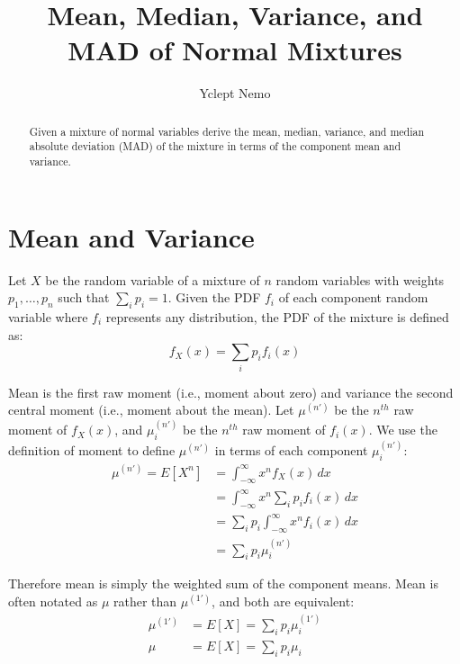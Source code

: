 \documentclass{article}
\title{Mean, Median, Variance, and MAD of Normal Mixtures}
\author{Yclept Nemo}
\begin{document}

\maketitle

\begin{abstract}\noindent
Given a mixture of normal variables derive the mean, median, variance, and median absolute deviation (MAD) of the mixture in terms of the component mean and variance.
\end{abstract}

\section{Mean and Variance}

Let $X$ be the random variable of a mixture of $n$ random variables with weights $p_1, \ldots, p_n$ such that $\sum_i p_i = 1$. Given the PDF $f_i$ of each component random variable where $f_i$ represents any distribution, the PDF of the mixture is defined as:
%
\begin{equation}\label{Mixture PDF}
f_X(x) = \sum_i p_i f_i(x)
\end{equation}

Mean is the first raw moment (i.e., moment about zero) and variance the second central moment (i.e., moment about the mean). Let $\mu^{(n')}$ be the $n^{th}$ raw moment of $f_X(x)$, and $\mu^{(n')}_i$ be the $n^{th}$ raw moment of $f_i(x)$. We use the definition of moment to define $\mu^{(n')}$ in terms of each component $\mu^{(n')}_i$:
%
\begin{equation}\label{Mixture Raw Moments}
\begin{split}
\mu^{(n')} = E[X^n] &= \int_{-\infty}^{\infty} x^n f_X(x) \,dx \\
& = \int_{-\infty}^{\infty} x^n \sum_i p_i f_i(x) \,dx \\
& = \sum_i p_i \int_{-\infty}^{\infty} x^n f_i(x) \,dx \\
& = \sum_i p_i \mu^{(n')}_i
\end{split}
\end{equation}

Therefore mean is simply the weighted sum of the component means. Mean is often notated as $\mu$ rather than $\mu^{(1')}$, and both are equivalent:
%
\begin{equation}\label{Mixture Mean}
\begin{split}
\mu^{(1')} &= E[X] =
    \sum_i p_i \mu^{(1')}_i \\
\mu &= E[X] =
    \sum_i p_i \mu_i 
\end{split}
\end{equation}
\end{document}

